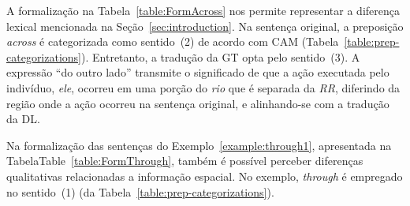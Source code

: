 \documentclass[a4paper, twocolumn, 11pt, twoside]{article}
\begin{document}
A formalização na Tabela~\ref{table:FormAcross} nos permite representar a diferença lexical mencionada na Seção~\ref{sec:introduction}. 
Na sentença original, a preposição \textit{across} é categorizada como sentido~(2) de acordo com CAM (Tabela~\ref{table:prep-categorizations}). 
Entretanto, a tradução da GT opta pelo sentido~(3). A expressão ``do outro lado'' transmite o significado de 
que a ação executada pelo indivíduo, \textit{ele}, ocorreu em uma porção do \textit{rio} que é separada da \textit{RR}, 
diferindo da região onde a ação ocorreu na sentença original, e alinhando-se com a tradução da DL.

Na formalização das sentenças do Exemplo~\ref{example:through1}, apresentada na TabelaTable~\ref{table:FormThrough},
também é possível perceber diferenças qualitativas relacionadas a informação espacial. No exemplo, \textit{through} é empregado no sentido~(1) (da Tabela~\ref{table:prep-categorizations}).
\end{document}
